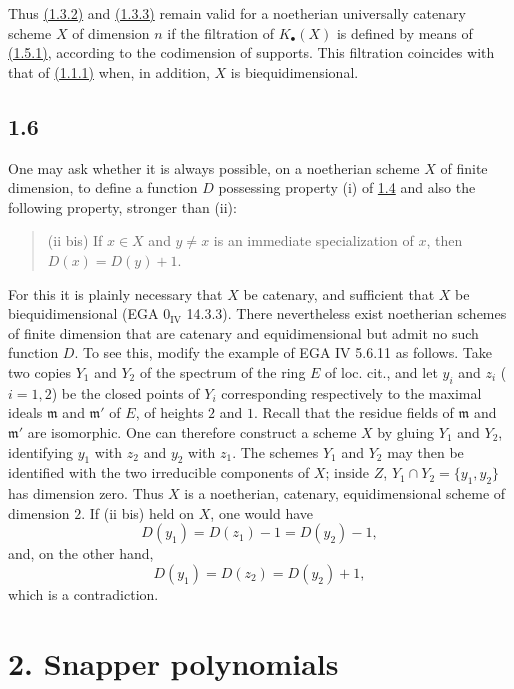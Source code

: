 Thus \hyperlink{sga6.e10.thm.1-3-2}{(1.3.2)} and \hyperlink{sga6.e10.cor.1-3-3}{(1.3.3)} remain valid for a noetherian universally catenary
scheme $X$ of dimension $n$ if the filtration of $K_\bullet(X)$ is defined by
means of \hyperlink{sga6.e10.eq.1-5-1}{(1.5.1)}, according to the codimension of supports. This filtration
coincides with that of \hyperlink{sga6.e10.def.1-1-1}{(1.1.1)} when, in addition, $X$ is biequidimensional.

\subsection*{1.6}
One may ask whether it is always possible, on a noetherian scheme $X$ of
finite dimension, to define a function $D$ possessing property (i) of \hyperlink{sga6.e10.rem.1-4}{1.4}
and also the following property, stronger than (ii):
\begin{quote}
(ii bis) If $x\in X$ and $y\ne x$ is an immediate specialization of $x$,
then $D(x)=D(y)+1$.
\end{quote}

For this it is plainly necessary that $X$ be catenary, and sufficient that
$X$ be biequidimensional (EGA $0_{\mathrm{IV}}$ 14.3.3). There nevertheless
exist noetherian schemes of finite dimension that are catenary and
equidimensional but admit no such function $D$. To see this, modify the
example of EGA IV 5.6.11 as follows. Take two copies $Y_1$ and $Y_2$ of the
spectrum of the ring $E$ of loc. cit., and let $y_i$ and $z_i$ ($i=1,2$) be
the closed points of $Y_i$ corresponding respectively to the maximal ideals
$\mathfrak m$ and $\mathfrak m'$ of $E$, of heights $2$ and $1$. Recall that
the residue fields of $\mathfrak m$ and $\mathfrak m'$ are isomorphic. One
can therefore construct a scheme $X$ by gluing $Y_1$ and $Y_2$, identifying
$y_1$ with $z_2$ and $y_2$ with $z_1$. The schemes $Y_1$ and $Y_2$ may then
be identified with the two irreducible components of $X$; inside $Z$,
$Y_1\cap Y_2=\{y_1,y_2\}$ has dimension zero. Thus $X$ is a noetherian,
catenary, equidimensional scheme of dimension $2$. If (ii bis) held on $X$,
one would have
\[
D(y_1)=D(z_1)-1=D(y_2)-1,
\]
and, on the other hand,
\[
D(y_1)=D(z_2)=D(y_2)+1,
\]
which is a contradiction.

\section*{2. Snapper polynomials}

